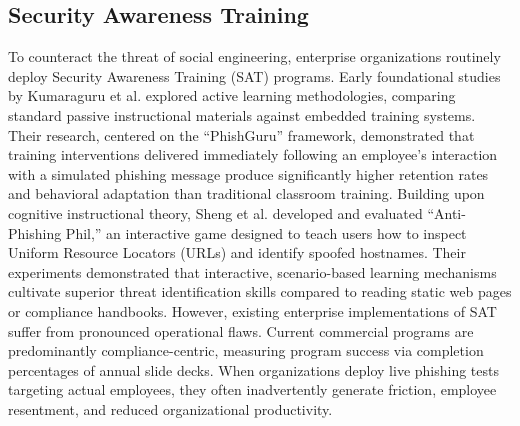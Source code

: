 \documentclass[conference,letterpaper]{IEEEtran}
\begin{document}
\subsection{Security Awareness Training}
To counteract the threat of social engineering, enterprise organizations routinely deploy Security Awareness Training (SAT) programs. Early foundational studies by Kumaraguru et al. \cite{kumaraguru2010} explored active learning methodologies, comparing standard passive instructional materials against embedded training systems. Their research, centered on the ``PhishGuru'' framework, demonstrated that training interventions delivered immediately following an employee's interaction with a simulated phishing message produce significantly higher retention rates and behavioral adaptation than traditional classroom training. Building upon cognitive instructional theory, Sheng et al. \cite{sheng2007} developed and evaluated ``Anti-Phishing Phil,'' an interactive game designed to teach users how to inspect Uniform Resource Locators (URLs) and identify spoofed hostnames. Their experiments demonstrated that interactive, scenario-based learning mechanisms cultivate superior threat identification skills compared to reading static web pages or compliance handbooks. However, existing enterprise implementations of SAT suffer from pronounced operational flaws. Current commercial programs are predominantly compliance-centric, measuring program success via completion percentages of annual slide decks. When organizations deploy live phishing tests targeting actual employees, they often inadvertently generate friction, employee resentment, and reduced organizational productivity.
\end{document}
